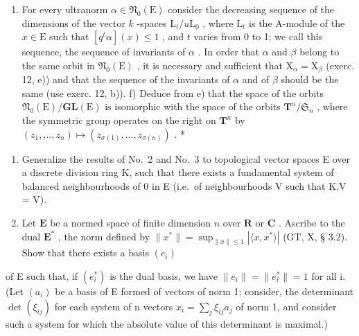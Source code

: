 \begin{enumerate}
\def\labelenumi{\alph{enumi})}
\setcounter{enumi}{4}
\tightlist
\item
  For every ultranorm \(\alpha \in \mathfrak{N}_0(\mathrm{E})\) consider the decreasing sequence of the dimensions of the vector \(k\) -spaces \(\mathrm{L}_t / u\mathrm{L}_0\) , where \(\mathrm{L}_t\) is the A-module of the \(x \in \mathrm{E}\) such that \([q^t\alpha](x) \leqslant 1\) , and \(t\) varies from 0 to 1; we call this sequence, the sequence of invariants of \(\alpha\) . In order that \(\alpha\) and \(\beta\) belong to the same orbit in \(\mathfrak{N}_0(\mathrm{E})\) , it is necessary and sufficient that \(\mathrm{X}_{\alpha} = \mathrm{X}_{\beta}\) (exerc. 12, e)) and that the sequence of the invariants of \(\alpha\) and of \(\beta\) should be the same (use exerc. 12, b)). f) Deduce from e) that the space of the orbits \(\mathfrak{N}_0(\mathrm{E}) / \mathbf{GL}(\mathrm{E})\) is isomorphic with the space of the orbits \(\mathbf{T}^n / \mathfrak{S}_n\) , where the symmetric group operates on the right on \(\mathbf{T}^n\) by \((z_1, ..., z_n) \mapsto (z_{\sigma(1)}, ..., z_{\sigma(n)})\) . *
\end{enumerate}

\begin{enumerate}
\def\labelenumi{\arabic{enumi})}
\setcounter{enumi}{13}
\item
  Generalize the results of No.~2 and No.~3 to topological vector spaces E over a discrete division ring K, such that there exists a fundamental system of balanced neighbourhoods of 0 in E (i.e.~of neighbourhoods V such that K.V = V).
\item
  Let \(\mathbf{E}\) be a normed space of finite dimension \(n\) over \(\mathbf{R}\) or \(\mathbf{C}\) . Ascribe to the dual \(\mathbf{E}^*\) , the norm defined by \(\| x^* \| = \sup_{\| x \| \leqslant 1} |\langle x, x^* \rangle|\) (GT, X, § 3.2). Show that there exists a basis \((e_i)\)
\end{enumerate}

of E such that, if \((e_{i}^{*})\) is the dual basis, we have \(\|e_{i}\| = \|e_{i}^{*}\| = 1\) for all i. (Let \((a_{i})\) be a basis of E formed of vectors of norm 1; consider, the determinant \(\det(\xi_{ij})\) for each system of n vectors \(x_{i} = \sum_{j} \xi_{ij} a_{j}\) of norm 1, and consider such a system for which the absolute value of this determinant is maximal.)

